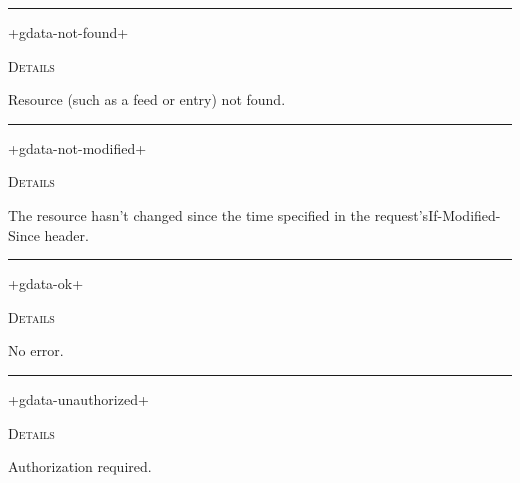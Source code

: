 \documentclass[a4paper]{report}
\begin{document}
  

    \rule{\linewidth}{0.1mm}
    
    \label{cl-gdata-service__variable__+gdata-not-found+}
    \begin{defun}[Variable]
    +gdata-not-found+


	
    \bigskip
    \textsc{Details}

Resource (such as a feed or entry) not found.


    
    \end{defun}
  
  

    \rule{\linewidth}{0.1mm}
    
    \label{cl-gdata-service__variable__+gdata-not-modified+}
    \begin{defun}[Variable]
    +gdata-not-modified+


	
    \bigskip
    \textsc{Details}

The resource hasn't changed since the time specified in the request'sIf-Modified-Since header.


    
    \end{defun}
  
  

    \rule{\linewidth}{0.1mm}
    
    \label{cl-gdata-service__variable__+gdata-ok+}
    \begin{defun}[Variable]
    +gdata-ok+


	
    \bigskip
    \textsc{Details}

No error.


    
    \end{defun}
  
  

    \rule{\linewidth}{0.1mm}
    
    \label{cl-gdata-service__variable__+gdata-unauthorized+}
    \begin{defun}[Variable]
    +gdata-unauthorized+


	
    \bigskip
    \textsc{Details}

Authorization required.


    
    \end{defun}
  
\end{document}

